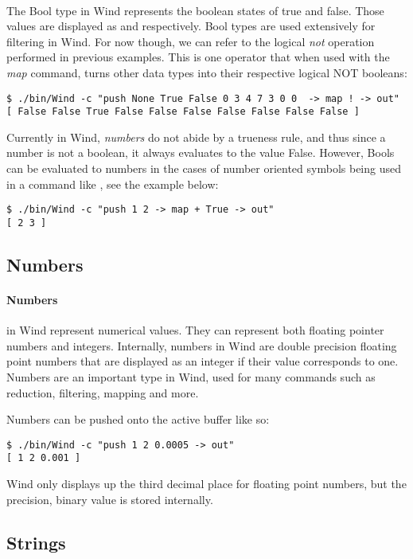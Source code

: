 \paragraph{  } The Bool type in Wind represents the boolean states of true and false. Those values are displayed as  and  respectively. Bool types are used extensively for filtering in Wind. For now though, we can refer to the logical \emph{not} operation performed in previous examples. This is one operator that when used with the \emph{map} command, turns other data types into their respective logical NOT booleans:

\begin{verbatim}
$ ./bin/Wind -c "push None True False 0 3 4 7 3 0 0  -> map ! -> out"
[ False False True False False False False False False False ]
\end{verbatim}

Currently in Wind, \emph{numbers} do not abide by a trueness rule, and thus since a number is not a boolean, it always evaluates to the value False. However, Bools can be evaluated to numbers in the cases of number oriented symbols being used in a command like , see the example below:

\begin{verbatim}
$ ./bin/Wind -c "push 1 2 -> map + True -> out"
[ 2 3 ]
\end{verbatim}

\subsection{Numbers}

\paragraph{Numbers} in Wind represent numerical values. They can represent both floating pointer numbers and integers. Internally, numbers in Wind are double precision floating point numbers that are displayed as an integer if their value corresponds to one. Numbers are an important type in Wind, used for many commands such as reduction, filtering, mapping and more.
\par Numbers can be pushed onto the active buffer like so:

\begin{verbatim}
$ ./bin/Wind -c "push 1 2 0.0005 -> out"
[ 1 2 0.001 ]
\end{verbatim}

\par Wind only displays up the third decimal place for floating point numbers, but the precision, binary value is stored internally.

\subsection{Strings}

